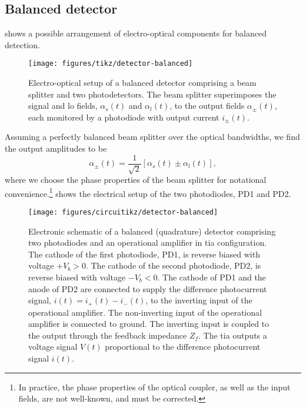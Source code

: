\FloatBarrier
\subsection{Balanced detector}


 shows a possible arrangement of electro-optical components for balanced detection.
\begin{figure}[htb]
    \centering
    \texttt{[image: figures/tikz/detector-balanced]}
    \caption{Electro-optical setup of a balanced detector comprising a beam splitter and two photodetectors. The beam splitter superimposes the signal and \gls{lo} fields, $\alpha_s(t)$ and $\alpha_l(t)$, to the output fields $\alpha_\pm(t)$, each monitored by a photodiode with output current $i_\pm(t)$.}\label{fig:detector_balanced_optics}
\end{figure}
Assuming a perfectly balanced beam splitter over the optical bandwidths, we find the output amplitudes to be
\begin{equation}
	\alpha_\pm(t)
	=
	\frac{1}{\sqrt{2}}
	\left[
		\alpha_s(t)
		\pm
		\alpha_l(t)
	\right]
	\label{eq:detector_balanced_amplitudes}
	,
\end{equation}
where we choose the phase properties of the beam splitter for notational convenience.\footnote{In practice, the phase properties of the optical coupler, as well as the input fields, are not well-known, and must be corrected.}
 shows the electrical setup of the two photodiodes, PD1 and PD2.
\begin{figure}[htb]
    \centering
    \texttt{[image: figures/circuitikz/detector-balanced]}
    \caption{Electronic schematic of a balanced (quadrature) detector comprising two photodiodes and an operational amplifier in \gls{tia} configuration. The cathode of the first photodiode, PD1, is reverse biased with voltage $+V_b>0$. The cathode of the second photodiode, PD2, is reverse biased with voltage $-V_b<0$. The cathode of PD1 and the anode of PD2 are connected to supply the difference photocurrent signal, $i(t)=i_+(t)-i_-(t)$, to the inverting input of the operational amplifier. The non-inverting input of the operational amplifier is connected to ground. The inverting input is coupled to the output through the feedback impedance $Z_f$. The \gls{tia} outputs a voltage signal $V(t)$ proportional to the difference photocurrent signal $i(t)$.}\label{fig:detector_balanced_electronics}
\end{figure}
